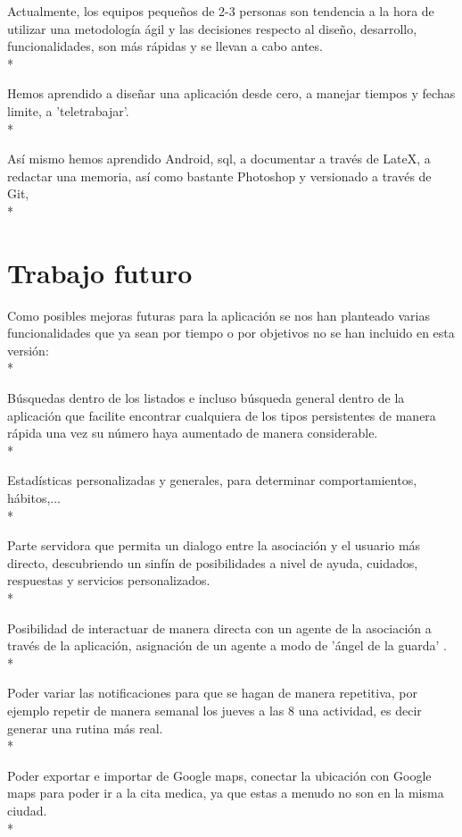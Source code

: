 \documentclass[../pfc.tex]{subfiles}
\begin{document}
	Actualmente, los equipos pequeños de 2-3 personas son tendencia a la hora de utilizar una metodología ágil y las decisiones respecto al diseño, desarrollo, funcionalidades, son más rápidas y se llevan a cabo antes.\\*
	
	Hemos aprendido a diseñar una aplicación desde cero, a manejar tiempos y fechas limite, a 'teletrabajar'.\\*
	
	Así mismo hemos aprendido Android, sql, a documentar a través de LateX, a redactar una memoria, así como bastante Photoshop y  versionado a través de Git,\\*
		
	
	\section{Trabajo futuro}
	
	Como posibles mejoras futuras para la aplicación se nos han planteado varias funcionalidades que ya sean por tiempo o por objetivos no se han incluido en esta versión:\\*	
	
	Búsquedas dentro de los listados e incluso búsqueda general dentro de la aplicación que facilite encontrar cualquiera de los tipos persistentes de manera rápida una vez su número haya aumentado de manera considerable.\\*
	
	Estadísticas personalizadas y generales, para determinar comportamientos, hábitos,...\\*
	
	Parte servidora que permita un dialogo entre la asociación y el usuario más directo, descubriendo un sinfín de posibilidades a nivel de ayuda, cuidados, respuestas y servicios personalizados.\\*
	
	Posibilidad de interactuar de manera directa con un agente de la asociación a través de la aplicación, asignación de un agente a modo de 'ángel de la guarda' .\\*
	
	Poder variar las notificaciones para que se hagan de manera repetitiva, por ejemplo repetir de manera semanal los jueves a las 8 una actividad, es decir generar una rutina más real. \\*
	
	Poder exportar e importar de Google maps, conectar la ubicación con Google maps para poder ir a la cita medica, ya que estas a menudo no son en la misma ciudad.\\*
	
\end{document}
